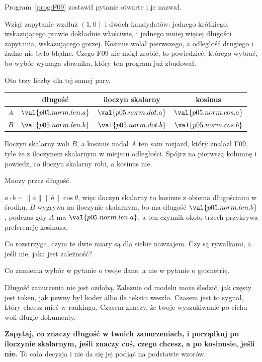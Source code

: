 \begin{fr}
Program~\ref{prog:F09} zostawił pytanie otwarte i je nazwał.

Wziął zapytanie wzdłuż $(1, 0)$ i dwóch kandydatów: jednego krótkiego,
wskazującego prawie dokładnie właściwie, i jednego mniej więcej długości
zapytania, wskazującego gorzej. Kosinus wolał pierwszego, a odległość drugiego
i żadne nie było błędne. Czego F09 nie mógł zrobić, to powiedzieć, którego
wybrać, bo wybór wymaga słownika, który ten program już zbudował.

Oto trzy liczby dla tej samej pary.
\end{fr}

\begin{fr}
\begin{center}
\begin{tabular}{lccc}
\toprule
& długość & iloczyn skalarny & kosinus \\
\midrule
$A$ & $\val{p05.norm.len.a}$ & $\val{p05.norm.dot.a}$ & $\val{p05.norm.cos.a}$ \\
$B$ & $\val{p05.norm.len.b}$ & $\val{p05.norm.dot.b}$ & $\val{p05.norm.cos.b}$ \\
\bottomrule
\end{tabular}
\end{center}

Iloczyn skalarny woli $B$, a kosinus nadal $A$ \dash{} ten sam rozjazd, który
znalazł F09, tyle że z iloczynem skalarnym w miejscu odległości. Spójrz na
pierwszą kolumnę i powiedz, co iloczyn skalarny robi, a kosinus nie.
\nextframe
\end{fr}

\begin{fr}
\begin{ansblock}
Mnoży przez długość.
\end{ansblock}

$a \cdot b = \lVert a \rVert \lVert b \rVert \cos\theta$, więc iloczyn skalarny
to kosinus z obiema długościami w środku. $B$ wygrywa na iloczynie skalarnym,
bo ma długość $\val{p05.norm.len.b}$, podczas gdy $A$ ma
$\val{p05.norm.len.a}$, a ten czynnik około trzech przykrywa preferencję
kosinusa.

Co rozstrzyga, czym te dwie miary są dla siebie nawzajem. Czy są rywalkami, a
jeśli nie, jaka jest zależność?
\dotline
\nextframe
\end{fr}

\begin{fr}
Co zamienia wybór w pytanie o twoje dane, a nie w pytanie o geometrię.

Długość zanurzenia nie jest ozdobą. Zależnie od modelu może śledzić, jak częsty
jest token, jak pewny był koder albo ile tekstu weszło. Czasem jest to sygnał,
który chcesz mieć w rankingu. Czasem znaczy, że twoje wyszukiwanie po cichu
woli długie dokumenty.

\textbf{Zapytaj, co znaczy długość w twoich zanurzeniach, i porządkuj po
iloczynie skalarnym, jeśli znaczy coś, czego chcesz, a po kosinusie, jeśli
nie.} To cała decyzja i nie da się jej podjąć na podstawie wzorów.
\end{fr}

